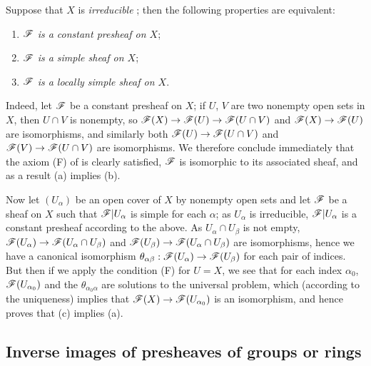 \begin{env}[3.6.2]
\label{0.3.6.2}
Suppose that $X$ is \emph{irreducible} ; then the following
properties are equivalent:
\begin{enumerate}[label=(\alph*)]
  \item \emph{$\mathscr{F}$ is a constant presheaf on $X$};
  \item \emph{$\mathscr{F}$ is a simple sheaf on $X$};
  \item \emph{$\mathscr{F}$ is a locally simple sheaf on $X$}.
\end{enumerate}

Indeed, let $\mathscr{F}$ be a constant presheaf on $X$; if $U$, $V$ are two nonempty
open sets in $X$, then $U\cap V$ is nonempty, so
$\sh{F}(X)\to\sh{F}(U)\to\sh{F}(U\cap V)$ and $\sh{F}(X)\to\sh{F}(U)$ are
isomorphisms, and similarly both $\sh{F}(U)\to\sh{F}(U\cap V)$ and
$\sh{F}(V)\to\sh{F}(U\cap V)$ are isomorphisms. We therefore conclude
immediately that the axiom (F) of  is clearly satisfied,
$\mathscr{F}$ is isomorphic to its associated sheaf, and as a result (a) implies (b).

Now let $(U_\alpha)$ be an open cover of $X$ by nonempty open sets and let
$\mathscr{F}$ be a sheaf on $X$ such that $\mathscr{F}|U_\alpha$ is simple for each
$\alpha$; as $U_\alpha$ is irreducible, $\mathscr{F}|U_\alpha$ is a constant presheaf
according to the above. As $U_\alpha\cap U_\beta$ is not empty,
$\sh{F}(U_\alpha)\to\sh{F}(U_\alpha\cap U_\beta)$ and
$\sh{F}(U_\beta)\to\sh{F}(U_\alpha\cap U_\beta)$ are isomorphisms, hence we have
a canonical isomorphism
$\theta_{\alpha\beta}:\sh{F}(U_\alpha)\to\sh{F}(U_\beta)$ for each pair of
indices. But then if we apply the condition (F) for $U=X$, we see that for each
index $\alpha_0$, $\mathscr{F}(U_{\alpha_0})$ and the $\theta_{\alpha_0\alpha}$ are
solutions to the universal problem, which (according to the uniqueness) implies
that $\sh{F}(X)\to\sh{F}(U_{\alpha_0})$ is an isomorphism, and hence proves that
(c) implies (a).
\end{env}

\subsection{Inverse images of presheaves of groups or rings}
\label{subsection:0.3.7}


